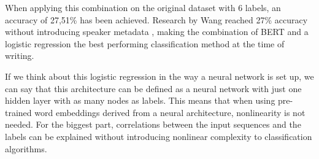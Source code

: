 When applying this combination on the original dataset with 6 labels, an accuracy of 27,51\% has been achieved. 
Research by Wang reached 27\% accuracy without introducing speaker metadata \cite{wang2018}, making the combination of BERT and a logistic regression the best performing classification method at the time of writing.

If we think about this logistic regression in the way a neural network is set up, we can say that this architecture can be defined as a neural network with just one hidden layer with as many nodes as labels. 
This means that when using pre-trained word embeddings derived from a neural architecture, nonlinearity is not needed.
For the biggest part, correlations between the input sequences and the labels can be explained without introducing nonlinear complexity to classification algorithms. 